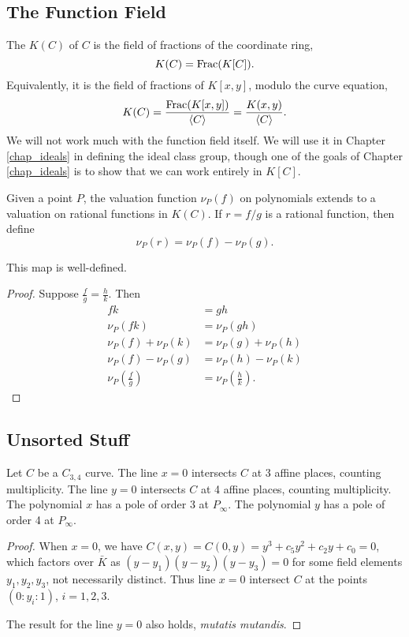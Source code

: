 \subsection{The Function Field}

The  $K(C)$ of $C$ is the field of fractions of the coordinate ring,
\[ K(C) = \operatorname{Frac}(K[C]). \]
Equivalently, it is the field of fractions of $K[x,y]$, modulo the curve equation,
\[ K(C) = \frac {\operatorname{Frac}(K[x,y])} {\left\langle C \right\rangle} = \frac {K(x,y)}{\left\langle C \right\rangle}. \]
We will not work much with the function field itself.
We will use it in Chapter \ref{chap_ideals} in defining the ideal class group,
though one of the goals of Chapter \ref{chap_ideals} is to show that we can work entirely in $K[C]$.

Given a point $P$, the valuation function $\nu_P(f)$ on polynomials extends to a valuation on rational functions in $K(C)$.
If $r = f/g$ is a rational function, then define
\[ \nu_P(r) = \nu_P(f) - \nu_P(g). \]

\begin{proposition}
  This map is well-defined.
\end{proposition}
\begin{proof}
  Suppose $\frac f g = \frac h k$. Then
  \begin{align*}
    fk &= gh \\
    \nu_P(fk) &= \nu_P(gh) \\
    \nu_P(f) + \nu_P(k) &= \nu_P(g) + \nu_P(h) \\
    \nu_P(f) - \nu_P(g) &= \nu_P(h) - \nu_P(k) \\
    \nu_P\left(\frac f g\right) &= \nu_P\left(\frac h k\right).
  \end{align*}
\end{proof}



\subsection{Unsorted Stuff}

\begin{proposition}
  Let $C$ be a $C_{3,4}$ curve.
  The line $x = 0$ intersects $C$ at 3 affine places, counting multiplicity.
  The line $y = 0$ intersects $C$ at 4 affine places, counting multiplicity.
  The polynomial $x$ has a pole of order 3 at $P_\infty$.
  The polynomial $y$ has a pole of order 4 at $P_\infty$.
\end{proposition}
\begin{proof}
  When $x = 0$, we have $C(x,y) = C(0,y) = y^3 + c_5y^2 + c_2y + c_0 = 0$,
  which factors over $\bar K$ as $(y - y_1)(y - y_2)(y - y_3) = 0$
  for some field elements $y_1, y_2, y_3$, not necessarily distinct.
  Thus line $x = 0$ intersect $C$ at the points $(0 : y_i : 1)$, $i = 1, 2, 3$.
  
  The result for the line $y = 0$ also holds, \emph{mutatis mutandis}.
  
\end{proof}

